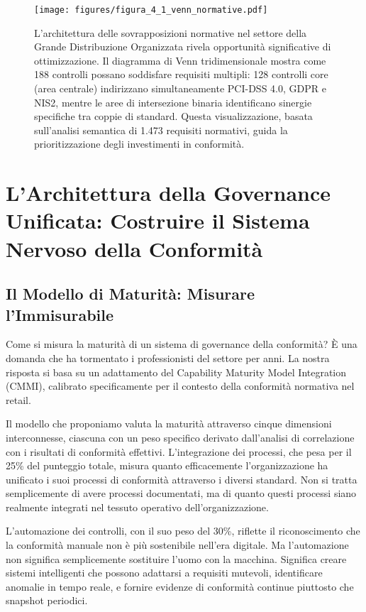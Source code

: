 \begin{figure}[htbp]
\centering
\texttt{[image: figures/figura\_4\_1\_venn\_normative.pdf]}
\caption{L'architettura delle sovrapposizioni normative nel settore della Grande Distribuzione Organizzata rivela opportunità significative di ottimizzazione. Il diagramma di Venn tridimensionale mostra come 188 controlli possano soddisfare requisiti multipli: 128 controlli core (area centrale) indirizzano simultaneamente PCI-DSS 4.0, GDPR e NIS2, mentre le aree di intersezione binaria identificano sinergie specifiche tra coppie di standard. Questa visualizzazione, basata sull'analisi semantica di 1.473 requisiti normativi, guida la prioritizzazione degli investimenti in conformità.}
\label{fig:venn_normative}
\end{figure}

\section{L'Architettura della Governance Unificata: Costruire il Sistema Nervoso della Conformità}

\subsection{Il Modello di Maturità: Misurare l'Immisurabile}

Come si misura la maturità di un sistema di governance della conformità? È una domanda che ha tormentato i professionisti del settore per anni. La nostra risposta si basa su un adattamento del Capability Maturity Model Integration (CMMI)\autocite{CMMI2023}, calibrato specificamente per il contesto della conformità normativa nel retail.

Il modello che proponiamo valuta la maturità attraverso cinque dimensioni interconnesse, ciascuna con un peso specifico derivato dall'analisi di correlazione con i risultati di conformità effettivi. L'integrazione dei processi, che pesa per il 25\% del punteggio totale, misura quanto efficacemente l'organizzazione ha unificato i suoi processi di conformità attraverso i diversi standard. Non si tratta semplicemente di avere processi documentati, ma di quanto questi processi siano realmente integrati nel tessuto operativo dell'organizzazione.

L'automazione dei controlli, con il suo peso del 30\%, riflette il riconoscimento che la conformità manuale non è più sostenibile nell'era digitale. Ma l'automazione non significa semplicemente sostituire l'uomo con la macchina. Significa creare sistemi intelligenti che possono adattarsi a requisiti mutevoli, identificare anomalie in tempo reale, e fornire evidenze di conformità continue piuttosto che snapshot periodici.

